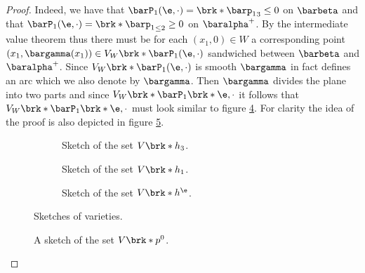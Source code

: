 \begin{proof}
  Indeed, we have that
  $\barP_1(\e,\cdot)=\brk*{\barp_1}_3\leq0$ on $\barbeta$ and that
  $\barP_1(\e,\cdot)=\brk*{\barp_1}_{\leq2}\geq0$ on $\baralpha^+$. By the intermediate value theorem thus there must be for each
  $(x_1,0)\in W$ a corresponding point 
  $(x_1,\bargamma(x_1))\in V_W\brk*{\barP_1(\e,\cdot)}$ sandwiched between $\barbeta$ and $\baralpha^+$.  
  Since $V_W\brk*{\barP_1(\e,\cdot)}$ is smooth $\bargamma$ in fact defines an arc which we also denote by $\bargamma$.
  Then $\bargamma$ divides the plane into two
  parts and since $V_W\brk*{\barP_1\brk*{\e,\cdot}}$ it follows that $V_W\brk*{\barP_1\brk*{\e,\cdot}}$
  must look similar to figure \ref{fi:n3_polynomial_intersectionOriginRegular}.
  For clarity the idea of the proof is also depicted in figure \ref{fi:n3_polynomial_intersectionOrigin_overview}.
  \begin{figure}
    \centering
    \begin{subfigure}[b]{0.3\textwidth}
    \centering
    
    \caption{Sketch of the set $V\brk*{h_3}$.}
    \label{fi:n3_polynomial_intersectionOriginDegenerate}
    \end{subfigure}
    \hfill
    \begin{subfigure}[b]{0.3\textwidth}
    \centering
    
    \caption{Sketch of the set $V\brk*{h_1}$.}
    \label{fi:n3_polynomial_intersectionOriginOtherTerm}
    \end{subfigure}
    \hfill
    \begin{subfigure}[b]{0.3\textwidth}
    \centering
    
    \caption{Sketch of the set $V\brk*{h^\e}$.}
    \label{fi:n3_polynomial_intersectionOriginRegular}
    \end{subfigure}
    \caption{Sketches of varieties.}
  \end{figure}
  \begin{figure}
    \centering
    
    \caption{A sketch of the set $V\brk*{p^0}$.}
    \label{fi:n3_polynomial_intersectionOrigin_overview}
  \end{figure}
\end{proof}

  
